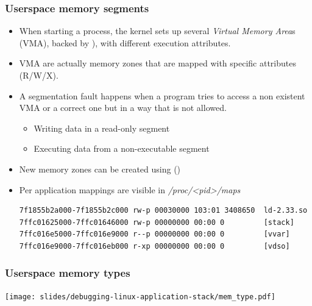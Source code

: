 \begin{frame}[fragile]
  \frametitle{Userspace memory segments}
  \begin{itemize}
    \item When starting a process, the kernel sets up several {\em Virtual
          Memory Area}s (VMA), backed by ), with
          different execution attributes.
    \item VMA are actually memory zones that are mapped with specific
          attributes (R/W/X).
    \item A segmentation fault happens when a program tries to access a non
          existent VMA or a correct one but in a way that is not allowed.
    \begin{itemize}
      \item Writing data in a read-only segment
      \item Executing data from a non-executable segment
    \end{itemize}
    \item New memory zones can be created using 
          ()
    \item Per application mappings are visible in {\em /proc/<pid>/maps}\\
    \begin{verbatim}
7f1855b2a000-7f1855b2c000 rw-p 00030000 103:01 3408650  ld-2.33.so
7ffc01625000-7ffc01646000 rw-p 00000000 00:00 0         [stack]
7ffc016e5000-7ffc016e9000 r--p 00000000 00:00 0         [vvar]
7ffc016e9000-7ffc016eb000 r-xp 00000000 00:00 0         [vdso]
    \end{verbatim}
  \end{itemize}
\end{frame}

\begin{frame}[fragile]
  \frametitle{Userspace memory types}
  \center \texttt{[image: slides/debugging-linux-application-stack/mem\_type.pdf]}
\end{frame}

